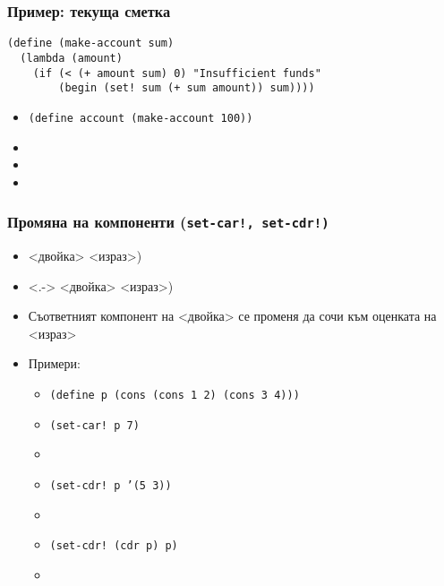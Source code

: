 \documentclass{beamer}
\begin{document}
\begin{frame}[fragile]
  \frametitle{Пример: текуща сметка}

\begin{verbatim}
(define (make-account sum)
  (lambda (amount)
    (if (< (+ amount sum) 0) "Insufficient funds"
        (begin (set! sum (+ sum amount)) sum))))
\end{verbatim}
  \onslide<+->
  \begin{itemize}[<+->]
  \item \tt{(define account (make-account 100))}
  \item {}
  \item {}
  \item {}
  \end{itemize}
\end{frame}

\begin{frame}
  \frametitle{Промяна на компоненти (\tt{set-car!}, \tt{set-cdr!})}
  \begin{itemize}[<+->]
  \item {}<двойка> <израз>\tta)
  \item<.-> <двойка> <израз>\tta)
  \item Съответният компонент на <двойка> се променя да сочи към оценката на <израз>
  \item Примери:
    \begin{itemize}
    \item \tt{(define p (cons (cons 1 2) (cons 3 4)))}
    \item \tt{(set-car! p 7)}
    \item {}
    \item \tt{(set-cdr! p '(5 3))}
    \item {}
    \item \tt{(set-cdr! (cdr p) p)}
    \item {}
    \end{itemize}
  \end{itemize}
\end{frame}
\end{document}

